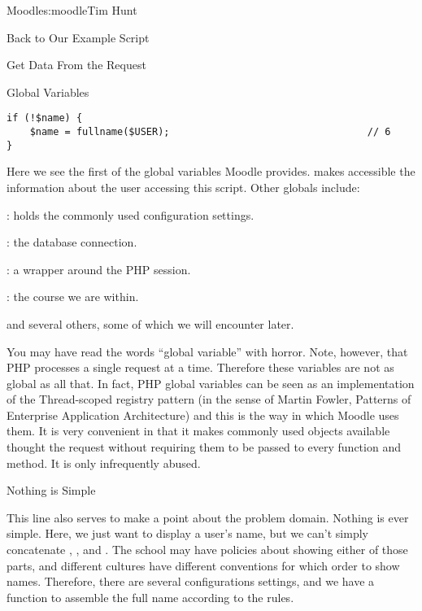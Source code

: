 \begin{aosachapter}{Moodle}{s:moodle}{Tim Hunt}
\begin{aosasect1}{Back to Our Example Script}
\begin{aosasect2}{Get Data From the Request}
\end{aosasect2}

\begin{aosasect2}{Global Variables}

\begin{verbatim}
if (!$name) {
    $name = fullname($USER);                                  // 6
}
\end{verbatim}

Here we see the first of the global variables Moodle
provides.  makes accessible the information about the
user accessing this script. Other globals include:

\begin{aosaitemize}

\item {}: holds the commonly used configuration settings.

\item {}: the database connection.

\item {}: a wrapper around the PHP session.

\item {}: the course we are within.

\end{aosaitemize}

\noindent
and several others, some of which we will encounter later.

You may have read the words ``global variable'' with horror. Note,
however, that PHP processes a single request at a time. Therefore
these variables are not as global as all that. In fact, PHP global
variables can be seen as an implementation of the Thread-scoped
registry pattern (in the sense of Martin Fowler, Patterns of
Enterprise Application Architecture) and this is the way in which
Moodle uses them. It is very convenient in that it makes commonly used
objects available thought the request without requiring them to be
passed to every function and method. It is only infrequently abused.

\end{aosasect2}

\begin{aosasect2}{Nothing is Simple}

This line also serves to make a point about the problem
domain. Nothing is ever simple. Here, we just want to display a user's
name, but we can't simply concatenate ,
, and . The school may have policies
about showing either of those parts, and different cultures have
different conventions for which order to show names. Therefore, there
are several configurations settings, and we have a function to
assemble the full name according to the rules.


\end{aosasect2}
\end{aosasect1}
\end{aosachapter}
